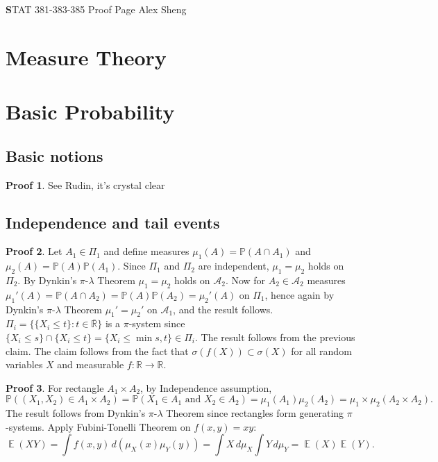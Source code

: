 \documentclass[hidelinks,11pt]{article}
\theoremstyle{definition}
\theoremstyle{dotless}
\newtheorem{prop}{Proof}[section]
\theoremstyle{remark}
\DeclareMathOperator{\E}{\mathbb{E}}
\DeclareMathOperator{\1}{\mathbf{1}}
\begin{document}
\begin{center}
{\Large\textbf STAT 381-383-385 \hspace{0.1cm} Proof Page}\medbreak
\large{Alex Sheng}
\end{center}

\section{Measure Theory}

\section{Basic Probability}

\subsection{Basic notions}

\begin{prop}
See Rudin, it's crystal clear
\end{prop}

\subsection{Independence and tail events}

\begin{prop}
Let $A_1\in\Pi_1$ and define measures $\mu_1(A)=\mathbb{P}(A\cap A_1)$ and $\mu_2(A)=\mathbb{P}(A)\mathbb{P}(A_1)$. Since $\Pi_1$ and $\Pi_2$ are independent, $\mu_1=\mu_2$ holds on $\Pi_2$. By Dynkin's $\pi$-$\lambda$ Theorem $\mu_1=\mu_2$ holds on $\mathcal{A}_2$. Now for $A_2\in\mathcal{A}_2$ measures $\mu_1'(A)=\mathbb{P}(A\cap A_2)=\mathbb{P}(A)\mathbb{P}(A_2)=\mu_2'(A)$ on $\Pi_1$, hence again by Dynkin's $\pi$-$\lambda$ Theorem $\mu_1'=\mu_2'$ on $\mathcal{A}_1$, and the result follows.\medbreak
$\Pi_i=\{\{X_i\leq t\}:t\in\overline{\mathbb{R}}\}$ is a $\pi$-system since $\{X_i\leq s\}\cap\{X_i\leq t\}=\{X_i\leq\min{s,t}\}\in\Pi_i$. The result follows from the previous claim.\medbreak
The claim follows from the fact that $\sigma(f(X))\subset\sigma(X)$ for all random variables $X$ and measurable $f:\mathbb{R}\to\mathbb{R}$.
\end{prop}

\begin{prop}
For rectangle $A_1\times A_2$, by Independence assumption,
\[\mathbb{P}((X_1,X_2)\in A_1\times A_2)=\mathbb{P}(X_1\in A_1\textrm{ and }X_2\in A_2)=\mu_1(A_1)\mu_2(A_2)=\mu_1\times\mu_2(A_2\times A_2).\]
The result follows from Dynkin's $\pi$-$\lambda$ Theorem since rectangles form generating $\pi$-systems.\medbreak
Apply Fubini-Tonelli Theorem on $f(x,y)=xy$:
\[\E(XY)=\int f(x,y)\,d(\mu_X(x)\mu_Y(y))=\int X\,d\mu_X\int Y\,d\mu_Y=\E(X)\E(Y).\]
\end{prop}
\end{document}
